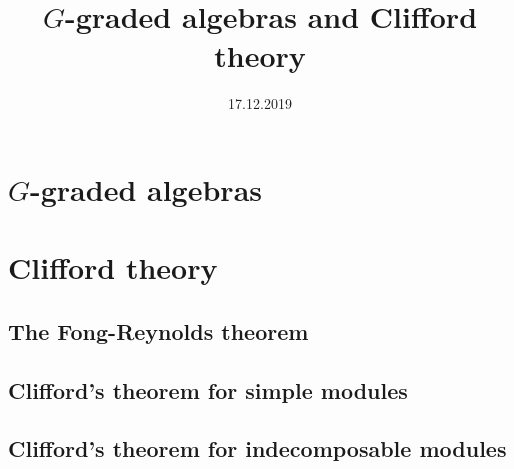 \documentclass[fontsize=11pt,fleqn,a4paper]{scrartcl}
\title{$G$-graded algebras and Clifford theory}
\date{17.12.2019}
\begin{document}
\maketitle

\section{$G$-graded algebras}


\section{Clifford theory}

\subsection{The Fong-Reynolds theorem}

\subsection{Clifford's theorem for simple modules}

\subsection{Clifford's theorem for indecomposable modules}

\end{document}
